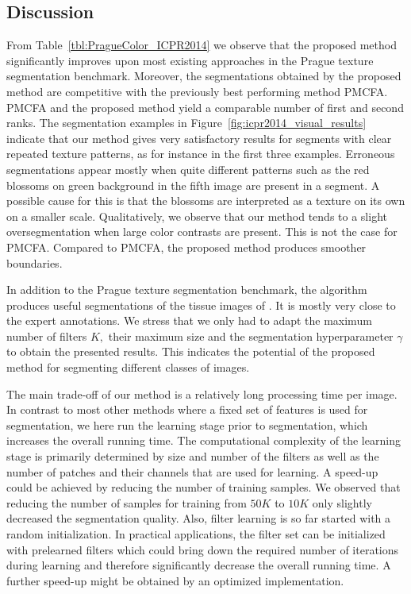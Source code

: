 \documentclass[journal]{IEEEtran}
\begin{document}
\subsection{Discussion}


From Table~\ref{tbl:PragueColor_ICPR2014}
we observe
that the proposed method significantly improves upon
most existing approaches in the Prague texture segmentation benchmark. 
Moreover, the segmentations obtained by the proposed method are competitive 
with the previously best performing method PMCFA. 
PMCFA and the proposed method yield a comparable number of first and second ranks.
   The segmentation examples in Figure~\ref{fig:icpr2014_visual_results}
 indicate that our method gives very satisfactory results for 
 segments with clear repeated texture patterns, as for instance in the first three examples. 
 Erroneous segmentations appear mostly 
 when quite different patterns 
 such as the red blossoms on green background in the fifth image
 are present in a segment.
 A possible cause for this is that the blossoms are interpreted as a texture on its own on a smaller scale.
 Qualitatively, we observe that our method tends to a slight oversegmentation 
  when large color contrasts are present. This is not the case for PMCFA.
  Compared to PMCFA, the proposed method produces smoother boundaries.
 
In addition to the Prague texture segmentation benchmark,
the algorithm produces useful segmentations of the tissue images of \cite{mccann2014}.
It is mostly very close to the expert annotations. 
We stress that we only had to adapt the maximum number of filters $K,$ their maximum size and the segmentation hyperparameter $\gamma$ 
to obtain the presented results.
This indicates the potential of the proposed method for segmenting different classes of images.

The main trade-off of our method is a relatively long processing time per image.
In contrast to most other methods where a fixed set of features is used for segmentation, we here run the learning stage prior to segmentation, which increases the overall running time.
The computational complexity of the learning stage is primarily determined by size and number of the filters as well as the number of patches and their channels that are used for learning.
A speed-up could be achieved by 
reducing the number of training samples. We observed that reducing the number of samples for training from $50K$ to $10K$ only slightly decreased the segmentation quality.
Also, filter learning is so far started with a random initialization. In practical applications, the filter set can be initialized with prelearned filters which could bring down the required number of iterations during learning and therefore significantly decrease the overall running time. A further speed-up might be obtained by an optimized implementation.
\end{document}

